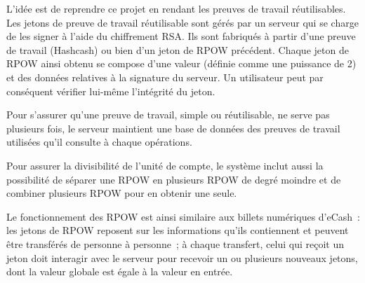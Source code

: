 
L'idée est de reprendre ce projet en rendant les preuves de travail réutilisables. Les jetons de preuve de travail réutilisable sont gérés par un serveur qui se charge de les signer à l'aide du chiffrement RSA. Ils sont fabriqués à partir d'une preuve de travail (Hashcash) ou bien d'un jeton de RPOW précédent. Chaque jeton de RPOW ainsi obtenu se compose d'une valeur (définie comme une puissance de 2) et des données relatives à la signature du serveur. Un utilisateur peut par conséquent vérifier lui-même l'intégrité du jeton.

Pour s'assurer qu'une preuve de travail, simple ou réutilisable, ne serve pas plusieurs fois, le serveur maintient une base de données des preuves de travail utilisées qu'il consulte à chaque opérations.

Pour assurer la divisibilité de l'unité de compte, le système inclut aussi la possibilité de séparer une RPOW en plusieurs RPOW de degré moindre et de combiner plusieurs RPOW pour en obtenir une seule.

Le fonctionnement des RPOW est ainsi similaire aux billets numériques d'eCash~: les jetons de RPOW reposent sur les informations qu'ils contiennent et peuvent être transférés de personne à personne~; à chaque transfert, celui qui reçoit un jeton doit interagir avec le serveur pour recevoir un ou plusieurs nouveaux jetons, dont la valeur globale est égale à la valeur en entrée.



